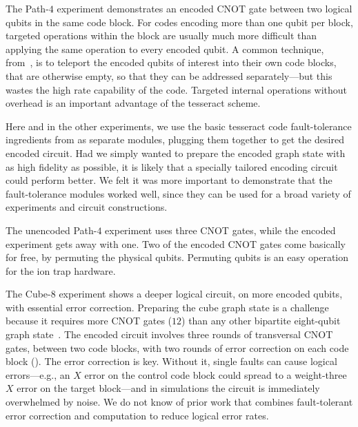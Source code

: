 \documentclass[10pt, twocolumn, aps, nofootinbib, longbibliography, nobibnotes, superscriptaddress]{revtex4-1} %
\begin{document}

\smallskip
The Path-$4$ experiment demonstrates an encoded CNOT gate between two logical qubits in the same code block.  For codes encoding more than one qubit per block, targeted operations within the block are usually much more difficult than applying the same operation to every encoded qubit.  A common technique, from~\cite{Gottesman97}, is to teleport the encoded qubits of interest into their own code blocks, that are otherwise empty, so that they can be addressed separately---but this wastes the high rate capability of the code.  Targeted internal operations without overhead is an important advantage of the tesseract scheme.  

Here and in the other experiments, we use the basic tesseract code fault-tolerance ingredients from  as separate modules, plugging them together to get the desired encoded circuit.  Had we simply wanted to prepare the encoded graph state with as high fidelity as possible, it is likely that a specially tailored encoding circuit could perform better.  We felt it was more important to demonstrate that the fault-tolerance modules worked well, since they can be used for a broad variety of experiments and circuit constructions.  

The unencoded Path-$4$ experiment uses three CNOT gates, while the encoded experiment gets away with one.  %
Two of the encoded CNOT gates come basically for free, by permuting the physical qubits. %
Permuting qubits is an easy operation for the ion trap hardware.  

\smallskip
The Cube-$8$ experiment shows a deeper logical circuit, on more encoded qubits, with essential error correction.  
Preparing the cube graph state is a challenge because it requires more CNOT gates ($12$) than any other bipartite eight-qubit graph state~\cite{CabelloDanielsenLopezTarridaPortillo10graphstatedatabase}.  
The encoded circuit involves three rounds of transversal CNOT gates, between two code blocks, with two rounds of error correction on each code block ().  The error correction is key.  Without it, single faults can cause logical errors---e.g., an $X$ error on the control code block could spread to a weight-three $X$ error on the target block---and in simulations the circuit is immediately overwhelmed by noise.  
%
We do not know of prior work %
that combines fault-tolerant error correction and computation to reduce logical error rates.  
\end{document}

